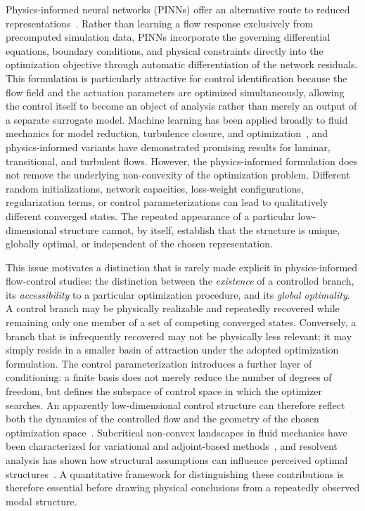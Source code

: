 \documentclass[a4paper,11pt]{article}
\begin{document}
Physics-informed neural networks (PINNs) offer an alternative route to
reduced representations~\cite{raissi2019pinn,cai2021pinnreview}. Rather than
learning a flow response exclusively from precomputed simulation data, PINNs
incorporate the governing differential equations, boundary conditions, and physical
constraints directly into the optimization objective through automatic differentiation
of the network residuals. This formulation is particularly attractive for control
identification because the flow field and the actuation parameters are optimized
simultaneously, allowing the control itself to become an object of analysis rather
than merely an output of a separate surrogate model. Machine learning has been
applied broadly to fluid mechanics for model reduction, turbulence closure, and
optimization~\cite{duraisamy2019turbulence,brenner2019perspective,lozano2020machine},
and physics-informed variants have demonstrated promising results for laminar,
transitional, and turbulent flows. However, the physics-informed formulation does
not remove the underlying non-convexity of the optimization problem. Different
random initializations, network capacities, loss-weight configurations, regularization
terms, or control parameterizations can lead to qualitatively different converged
states. The repeated appearance of a particular low-dimensional structure cannot,
by itself, establish that the structure is unique, globally optimal, or independent
of the chosen representation.

This issue motivates a distinction that is rarely made explicit in physics-informed
flow-control studies: the distinction between the \emph{existence} of a controlled
branch, its \emph{accessibility} to a particular optimization procedure, and its
\emph{global optimality}. A control branch may be physically realizable and
repeatedly recovered while remaining only one member of a set of competing
converged states. Conversely, a branch that is infrequently recovered may not
be physically less relevant; it may simply reside in a smaller basin of attraction
under the adopted optimization formulation. The control parameterization introduces
a further layer of conditioning: a finite basis does not merely reduce the number
of degrees of freedom, but defines the subspace of control space in which the
optimizer searches. An apparently low-dimensional control structure can therefore
reflect both the dynamics of the controlled flow and the geometry of the chosen
optimization space~\cite{taira2017modal,bagheri2009global,sipp2010global}.
Subcritical non-convex landscapes in fluid mechanics have been characterized for
variational and adjoint-based methods~\cite{farano2016subcritical}, and resolvent
analysis has shown how structural assumptions can influence perceived optimal
structures~\cite{beneddine2016conditions}. A quantitative framework for
distinguishing these contributions is therefore essential before drawing physical
conclusions from a repeatedly observed modal structure.
\end{document}
